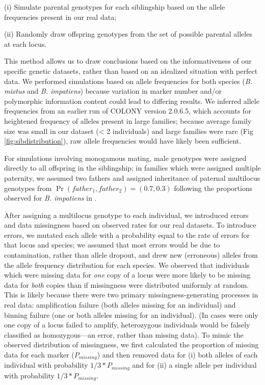 \documentclass[12pt]{article}
\begin{document}
(i) Simulate parental genotypes for each siblingship based on the allele frequencies present in our real data;

(ii) Randomly draw offspring genotypes from the set of possible parental alleles at each locus.

This method allows us to draw conclusions based on the informativeness of our specific genetic datasets, rather than based on an idealized situation with perfect data. We performed simulations based on allele frequencies for both species (\emph{B. mixtus} and \emph{B. impatiens}) because variation in marker number and/or polymorphic information content could lead to differing results. We inferred allele frequencies from an earlier run of COLONY version 2.0.6.5, which accounts for heightened frequency of alleles present in large families; because average family size was small in our dataset (< 2 individuals) and large families were rare (Fig \ref{fig:sibdistribution}), raw allele frequencies would have likely been sufficient.

For simulations involving monogamous mating, male genotypes were assigned directly to all offspring in the siblingship; in families which were assigned multiple paternity, we assumed two fathers and assigned inheritance of paternal multilocus genotypes from $\Pr(father_1, father_2) = (0.7, 0.3)$ following the proportions observed for \emph{B. impatiens} in \textcite{birdMatingFrequencyEstimation2024}.

After assigning a multilocus genotype to each individual, we introduced errors and data missingness based on observed rates for our real datasets. To introduce errors, we mutated each allele with a probability equal to the rate of errors for that locus and species; we assumed that most errors would be due to contamination, rather than allele dropout, and drew new (erroneous) alleles from the allele frequency distribution for each species. We observed that individuals which were missing data for \emph{one} copy of a locus were more likely to be missing data for \emph{both} copies than if missingness were distributed uniformly at random. This is likely because there were two primary missingness-generating processes in real data: amplification failure (both alleles missing for an individual) and binning failure (one or both alleles missing for an individual). (In cases were only one copy of a locus failed to amplify, heterozygous individuals would be falsely classified as homozygous---an error, rather than missing data). To mimic the observed distribution of missingness, we first calculated the proportion of missing data for each marker ($P_{missing}$) and then removed data for (i) both alleles of each individual with probability $1/3 * P_{missing}$ and for (ii) a single allele per individual with probability $1/3 * P_{missing}$.
\end{document}
